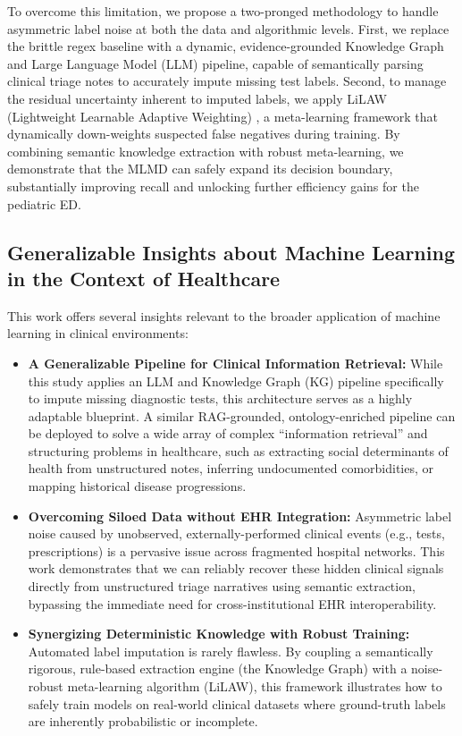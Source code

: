 \documentclass[pmlr]{jmlr}%
\begin{document}
To overcome this limitation, we propose a two-pronged methodology to handle asymmetric label noise at both the data and algorithmic levels. First, we replace the brittle regex baseline with a dynamic, evidence-grounded Knowledge Graph and Large Language Model (LLM) pipeline, capable of semantically parsing clinical triage notes to accurately impute missing test labels. Second, to manage the residual uncertainty inherent to imputed labels, we apply LiLAW (Lightweight Learnable Adaptive Weighting) \cite{moturu2025lilaw}, a meta-learning framework that dynamically down-weights suspected false negatives during training. By combining semantic knowledge extraction with robust meta-learning, we demonstrate that the MLMD can safely expand its decision boundary, substantially improving recall and unlocking further efficiency gains for the pediatric ED.

\subsection*{Generalizable Insights about Machine Learning in the Context of Healthcare}

This work offers several insights relevant to the broader application of machine learning in clinical environments:

\begin{itemize}
    \item \textbf{A Generalizable Pipeline for Clinical Information Retrieval:} While this study applies an LLM and Knowledge Graph (KG) pipeline specifically to impute missing diagnostic tests, this architecture serves as a highly adaptable blueprint. A similar RAG-grounded, ontology-enriched pipeline can be deployed to solve a wide array of complex ``information retrieval'' and structuring problems in healthcare, such as extracting social determinants of health from unstructured notes, inferring undocumented comorbidities, or mapping historical disease progressions.
    \item \textbf{Overcoming Siloed Data without EHR Integration:} Asymmetric label noise caused by unobserved, externally-performed clinical events (e.g., tests, prescriptions) is a pervasive issue across fragmented hospital networks. This work demonstrates that we can reliably recover these hidden clinical signals directly from unstructured triage narratives using semantic extraction, bypassing the immediate need for cross-institutional EHR interoperability.
    \item \textbf{Synergizing Deterministic Knowledge with Robust Training:} Automated label imputation is rarely flawless. By coupling a semantically rigorous, rule-based extraction engine (the Knowledge Graph) with a noise-robust meta-learning algorithm (LiLAW), this framework illustrates how to safely train models on real-world clinical datasets where ground-truth labels are inherently probabilistic or incomplete.
\end{itemize}
\end{document}
